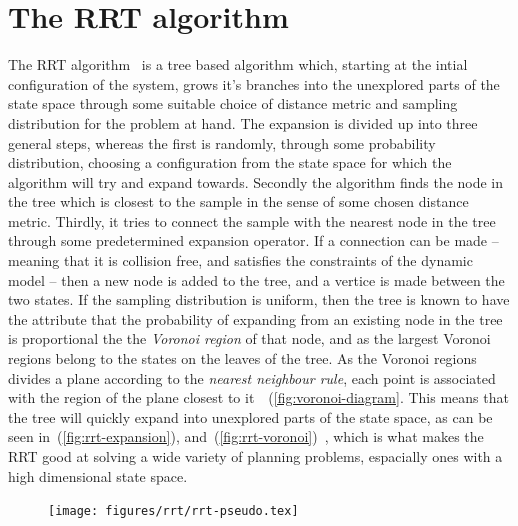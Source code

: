 \section{The RRT algorithm}

The \ac{RRT} algorithm~\cite[LaValle]{article} is a tree based algorithm which,
starting at the intial configuration of the system, grows it's branches into the
unexplored parts of the state space through some suitable choice of distance
metric and sampling distribution for the problem at hand. The expansion is
divided up into three general steps, whereas the first is randomly, through some
probability distribution, choosing a configuration from the state space for
which the algorithm will try and expand towards. Secondly the algorithm finds
the node in the tree which is closest to the sample in the sense of some chosen
distance metric. Thirdly, it tries to connect the sample with the nearest node
in the tree through some predetermined expansion operator. If a connection can
be made -- meaning that it is collision free, and satisfies the constraints of
the dynamic model -- then a new node is added to the tree, and a vertice is made
between the two states. If the sampling distribution is uniform, then the tree
is known to have the attribute that the probability of expanding from an
existing node in the tree is proportional the the \textit{Voronoi region} of
that node, and as the largest Voronoi regions belong to the states on the leaves
of the tree. As the Voronoi regions divides a plane according to the
\textit{nearest neighbour rule}, each point is associated with the region of the
plane closest to
it~\cite{aurenhammerVoronoiDiagramsSurvey1991}~(\ref{fig:voronoi-diagram}. This
means that the tree will quickly expand into unexplored parts of the state
space, as can be seen in~(\ref{fig:rrt-expansion}),
and~(\ref{fig:rrt-voronoi})~\cite{Lav06}, which is what makes the \ac{RRT} good
at solving a wide variety of planning problems, espacially ones with a high
dimensional state space.

\begin{figure}
  \centering \texttt{[image: figures/rrt/rrt-pseudo.tex]}
\end{figure}

